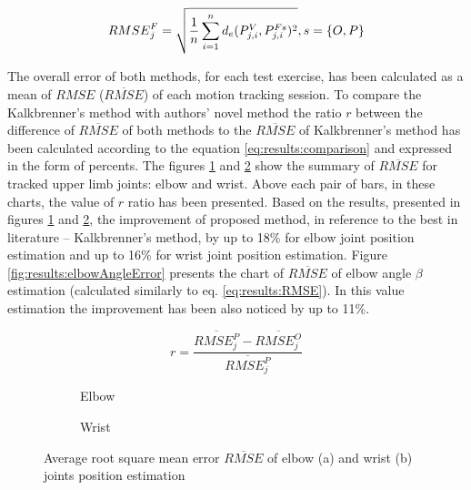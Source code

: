 \documentclass[sensors,article,submit,moreauthors,pdftex,10pt,a4paper]{mdpi}
\begin{document}
\begin{equation}
	\centering
	{RMSE}^F_j = \sqrt{\frac{1}{n}\sum_{i=1}^{n}{d_e(P^V_{j,i}, P^{Fs}_{j,i})^2}} , s = \{O,P\}
	\label{eq:results:RMSE}
\end{equation}

The overall error of both methods, for each test exercise, has been calculated as a mean of $RMSE$ ($\overline{RMSE}$) of each motion tracking session. To compare the Kalkbrenner’s method with authors’ novel method the ratio $r$ between the difference of $\overline{RMSE}$ of both methods to the $\overline{RMSE}$ of Kalkbrenner’s method has been calculated according to the equation \ref{eq:results:comparison} and expressed in the form of percents. The figures \ref{fig:results:positionError:a} and \ref{fig:results:positionError:b} show the summary of  $\overline{RMSE}$ for tracked upper limb joints: elbow and wrist. Above each pair of bars, in these charts, the value of $r$ ratio has been presented. Based on the results, presented in figures \ref{fig:results:positionError:a} and \ref{fig:results:positionError:b}, the improvement of proposed method, in reference to the best in literature -- Kalkbrenner’s method, by up to 18\% for elbow joint position estimation and up to 16\% for wrist joint position estimation. Figure \ref{fig:results:elbowAngleError} presents the chart of $\overline{RMSE}$ of elbow angle $\beta$ estimation (calculated similarly to eq. \ref{eq:results:RMSE}). In this value estimation the improvement has been also noticed by up to 11\%.

\begin{equation}
	r = \frac{\overline{RMSE^P_j} - \overline{RMSE^O_j}}{\overline{RMSE^P_j}}
	\label{eq:results:comparison}
\end{equation}

\begin{figure}[H]
	\centering
	\begin{subfigure}[b]{0.49\textwidth}
		\centering
		
		\caption{Elbow}
		\label{fig:results:positionError:a}
	\end{subfigure} \hfill
	\begin{subfigure}[b]{0.49\textwidth}
		\centering
		
		\caption{Wrist}
		\label{fig:results:positionError:b}
	\end{subfigure}
	\caption{Average root square mean error $\overline{RMSE}$ of elbow (a) and wrist (b) joints position estimation}
	\label{fig:results:positionError}
\end{figure}   
\end{document}
